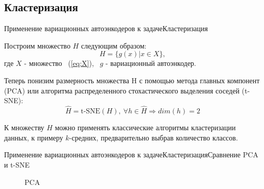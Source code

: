 \documentclass{beamer}
\begin{document}
\subsection{Кластеризация}

\begin{frame}{Применение вариационных автоэнкодеров к задаче}{Кластеризация}

Построим множество $H$ следующим образом:
\begin{equation}\label{eq:H}
H = \{g(x) | x \in X\},
\end{equation}
где $X$ - множество ~(\ref{eq:X}), ~$g$ - вариационный автоэнкодер. \par\medskip
Теперь понизим размерность множества H с помощью метода главных компонент (PCA) или алгоритма распределенного стохастического выделения соседей (t-SNE):
\begin{equation}\label{eq:hH}
\hat{H} = \text{t-SNE}(H), ~\forall h \in \hat{H} \Rightarrow dim(h) = 2
\end{equation}

К множеству $\hat{H}$ можно применять классические алгоритмы кластеризации данных, к примеру $k$-средних, предварительно выбрав количество классов.

\end{frame}

\begin{frame}{Применение вариационных автоэнкодеров к задаче}{Кластеризация}{Сравнение PCA и t-SNE}

\begin{figure}[h]{PCA}
	\label{fig:images_pca}
\end{figure}

\end{frame}
\end{document}
